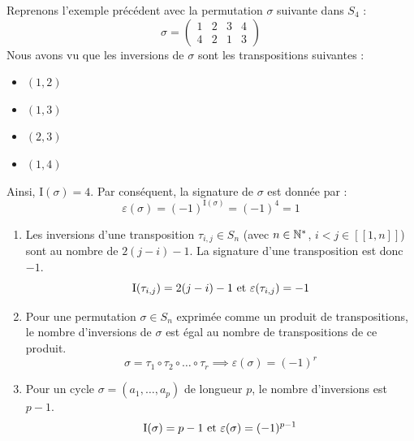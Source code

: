 \documentclass[12pt, a4paper]{report}
\begin{document}
\begin{example}
    Reprenons l'exemple précédent avec la permutation $\sigma$ suivante dans $S_4$ :
    $$\sigma = \left(\begin{matrix} 1 & 2 & 3 & 4 \\ 4 & 2 & 1 & 3 \end{matrix}\right)$$
    Nous avons vu que les inversions de $\sigma$ sont les transpositions suivantes :
    \begin{itemize}
        \item $(1,2)$
        \item $(1,3)$
        \item $(2,3)$
        \item $(1,4)$
    \end{itemize}
    Ainsi, $\mathrm{I}(\sigma) = 4$. Par conséquent, la signature de $\sigma$ est donnée par :
    $$\varepsilon(\sigma) = (-1)^{\mathrm{I}(\sigma)} = (-1)^4 = 1$$
\end{example}

\begin{remark}
    \begin{enumerate}
        \item Les inversions d'une transposition $\tau_{i,j} \in S_n$ (avec $n \in \mathbb{N}^*$, $i < j \in [\![1,n]\!]$) sont au nombre de $2(j - i) - 1$. La signature d'une transposition est donc $-1$.
        $$\mathrm{I}(\tau_{i,j}) = 2(j - i) - 1 \text{ et } \varepsilon(\tau_{i,j}) = -1$$
        \item Pour une permutation $\sigma \in S_n$ exprimée comme un produit de transpositions, le nombre d'inversions de $\sigma$ est égal au nombre de transpositions de ce produit.
        $$\sigma = \tau_1 \circ \tau_2 \circ \dots \circ \tau_r \implies \varepsilon(\sigma) = (-1)^r$$
        \item Pour un cycle $\sigma = (a_1,\dots,a_p)$ de longueur $p$, le nombre d'inversions est $p-1$.
        $$\mathrm{I}(\sigma) = p - 1 \text{ et } \varepsilon(\sigma) = (-1)^{p-1}$$
    \end{enumerate}
\end{remark}
\end{document}
